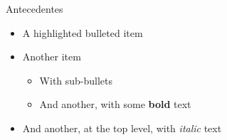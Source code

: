 \begin{frame}{\color{blue}Antecedentes}

  
  \begin{itemize}
    \item A \alert{highlighted} bulleted item
      \pause
    \item Another item
      \begin{itemize}
        \item With sub-bullets
        \item And another, with some \textbf{bold} text
      \end{itemize}
    \item And another, at the top level, with \textit{italic} text
  \end{itemize}
  
\end{frame}
